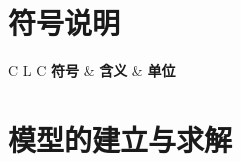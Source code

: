\documentclass[withoutpreface,bwprint]{format}
\begin{document}
\section{符号说明}
\label{sec:notation}
\begin{table}[htbp]
  \centering
  \caption{主要符号及其含义}
  \label{tab:symbols}
  \begin{tabularx}{\textwidth}{C L C}
    \toprule
    \textbf{符号} & \textbf{含义} & \textbf{单位} \\
    \midrule
    \bottomrule
  \end{tabularx}
\end{table}

\section{模型的建立与求解}
\label{sec:model-solution}
\end{document}
